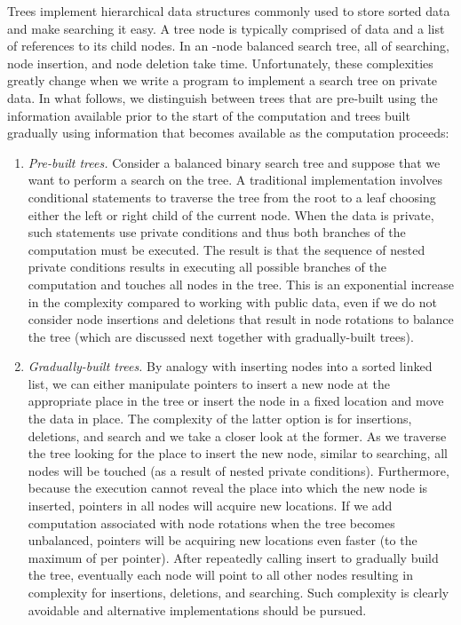 \documentclass[11pt]{article}
\begin{document}
Trees implement hierarchical data structures commonly used to store sorted
data and make searching it easy. A tree node is typically comprised of data
and a list of references to its child nodes. In an -node balanced search
tree, all of searching, node insertion, and node deletion take 
time. Unfortunately, these complexities greatly change when we write a
program to implement a search tree on private data. In what follows, we
distinguish between trees that are pre-built using the information
available prior to the start of the computation and trees built gradually
using information that becomes available as the computation proceeds: 
\begin{enumerate}
\item \emph{Pre-built trees.} Consider a balanced binary search tree and
  suppose that we want to perform a search on the tree. A traditional
  implementation involves  conditional statements to traverse the
  tree from the root to a leaf choosing either the left or right child of
  the current node. When the data is private, such statements use private
  conditions and thus both branches of the computation must be executed. The
  result is that the sequence of  nested private conditions
  results in executing all possible  branches of the computation and
  touches all nodes in the tree. This is an exponential increase in the
  complexity compared to working with public data, even if we do not consider
  node insertions and deletions that result in node rotations to balance the
  tree (which are discussed next together with gradually-built trees). 

\item \emph{\it Gradually-built trees.} By analogy with inserting nodes into
  a sorted linked list, we can either manipulate pointers to insert a new
  node at the appropriate place in the tree or insert the node in a fixed
  location and move the data in place. The complexity of the latter option
  is  for insertions, deletions, and search and we take a closer look
  at the former. As we traverse the tree looking for the place to insert the
  new node, similar to searching, all nodes will be touched (as a result of
  nested private conditions). Furthermore, because the execution cannot
  reveal the place into which the new node is inserted, pointers in all
  nodes will acquire new locations. If we add computation associated with
  node rotations when the tree becomes unbalanced, pointers will be
  acquiring new locations even faster (to the maximum of  per pointer).
  After repeatedly calling insert to gradually build the tree, eventually
  each node will point to all other nodes resulting in  complexity
  for insertions, deletions, and searching. Such complexity is clearly
  avoidable and alternative implementations should be pursued.
\end{enumerate}
\end{document}

